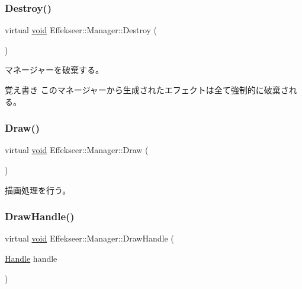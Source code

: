\subsubsection{\texorpdfstring{Destroy()}{Destroy()}}
{\footnotesize\ttfamily virtual \mbox{\hyperlink{namespace_effekseer_ab34c4088e512200cf4c2716f168deb56}{void}} Effekseer\+::\+Manager\+::\+Destroy (\begin{DoxyParamCaption}{ }\end{DoxyParamCaption})\hspace{0.3cm}{\ttfamily [pure virtual]}}



マネージャーを破棄する。 

\begin{DoxyNote}{覚え書き}
このマネージャーから生成されたエフェクトは全て強制的に破棄される。 
\end{DoxyNote}
\mbox{\label{class_effekseer_1_1_manager_a17431b7d96325535fa62bcbb066f0a9c}} 
\subsubsection{\texorpdfstring{Draw()}{Draw()}}
{\footnotesize\ttfamily virtual \mbox{\hyperlink{namespace_effekseer_ab34c4088e512200cf4c2716f168deb56}{void}} Effekseer\+::\+Manager\+::\+Draw (\begin{DoxyParamCaption}{ }\end{DoxyParamCaption})\hspace{0.3cm}{\ttfamily [pure virtual]}}



描画処理を行う。 

\mbox{\label{class_effekseer_1_1_manager_a9eaa0c0f968351b53c46f9735cc40a79}} 
\subsubsection{\texorpdfstring{Draw\+Handle()}{DrawHandle()}}
{\footnotesize\ttfamily virtual \mbox{\hyperlink{namespace_effekseer_ab34c4088e512200cf4c2716f168deb56}{void}} Effekseer\+::\+Manager\+::\+Draw\+Handle (\begin{DoxyParamCaption}\item[{\mbox{\hyperlink{namespace_effekseer_afba58b8d812da862190e9bbfc040824a}{Handle}}}]{handle }\end{DoxyParamCaption})\hspace{0.3cm}{\ttfamily [pure virtual]}}



